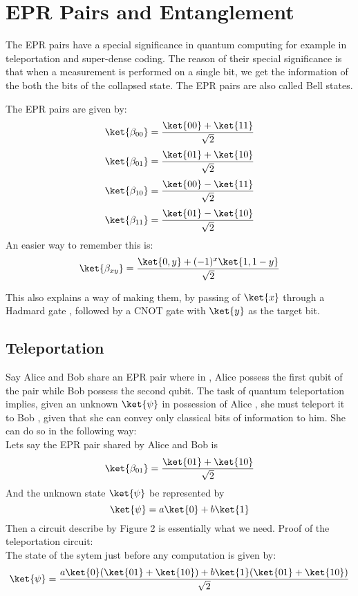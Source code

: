 \section{EPR Pairs and Entanglement}
The EPR pairs have a special significance in quantum computing for example in teleportation and super-dense coding. The reason of their special significance is that when a measurement is performed on a single bit, we get the information of the both the bits of the collapsed state. The EPR pairs are also called Bell states.
\par
The EPR pairs are given by:
$$\ket{\beta_{00}} = \frac{\ket{00}+\ket{11}}{\sqrt{2}}  $$
$$\ket{\beta_{01}} = \frac{\ket{01}+\ket{10}}{\sqrt{2}}  $$
$$\ket{\beta_{10}} = \frac{\ket{00}-\ket{11}}{\sqrt{2}}  $$
$$\ket{\beta_{11}} = \frac{\ket{01}-\ket{10}}{\sqrt{2}}  $$
An easier way to remember this is:
$$\ket{\beta_{xy}} = \frac{\ket{0,y} + (-1)^x \ket{1,1 -y}}{\sqrt{2}}$$

This also explains a way of making them, by passing of $\ket{x}$
through a Hadmard gate , followed by a CNOT gate with $\ket{y}$ as the target bit.
\subsection{Teleportation}
Say Alice and Bob share an EPR pair where in , Alice possess the first qubit of the pair while Bob possess the second qubit. The task of quantum teleportation implies, given an unknown $\ket{\psi}$ in possession of Alice , she must teleport it to Bob , given that she can convey only classical bits of information to him. She can do so in the following way:\\
Lets say the EPR pair shared by Alice and Bob is
$$\ket{\beta_{01}} = \frac{\ket{01}+\ket{10}}{\sqrt{2}}  $$
And the unknown state $\ket{\psi}$ be represented by 
	$$\ket{\psi} = a\ket{0} + b\ket{1}$$
Then a circuit describe by Figure 2 is essentially what we need.
Proof of the teleportation circuit:\\  
The state of the sytem just before any computation is given by:
$$\ket{\psi} = \frac{a\ket{0}(\ket{01}+\ket{10}) + b\ket{1}(\ket{01}+\ket{10})}{\sqrt{2}}$$


